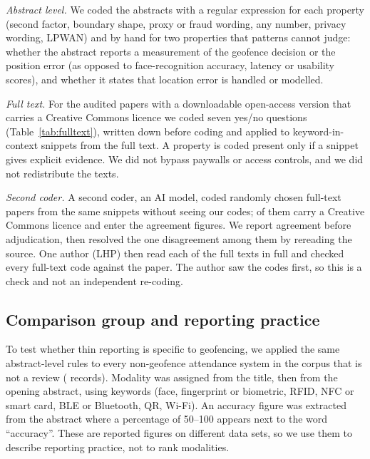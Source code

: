 \documentclass[12pt]{article}
\begin{document}
\emph{Abstract level.} We coded the abstracts with a regular expression for each property (second factor, boundary shape, proxy or fraud wording, any number, privacy wording, LPWAN) and by hand for two properties that patterns cannot judge: whether the abstract reports a measurement of the geofence decision or the position error (as opposed to face-recognition accuracy, latency or usability scores), and whether it states that location error is handled or modelled.

\emph{Full text.} For the audited papers with a downloadable open-access version that carries a Creative Commons licence we coded seven yes/no questions (Table~\ref{tab:fulltext}), written down before coding and applied to keyword-in-context snippets from the full text. A property is coded present only if a snippet gives explicit evidence. We did not bypass paywalls or access controls, and we did not redistribute the texts.

\emph{Second coder.} A second coder, an AI model, coded \agNAll{} randomly chosen full-text papers from the same snippets without seeing our codes; \agN{} of them carry a Creative Commons licence and enter the agreement figures. We report agreement before adjudication, then resolved the one disagreement among them by rereading the source. One author (LHP) then read each of the \ftN{} full texts in full and checked every full-text code against the paper. The author saw the codes first, so this is a check and not an independent re-coding.

\subsection{Comparison group and reporting practice}
To test whether thin reporting is specific to geofencing, we applied the same abstract-level rules to every non-geofence attendance system in the corpus that is not a review (\nOthers{} records). Modality was assigned from the title, then from the opening abstract, using keywords (face, fingerprint or biometric, RFID, NFC or smart card, BLE or Bluetooth, QR, Wi-Fi). An accuracy figure was extracted from the abstract where a percentage of 50--100 appears next to the word ``accuracy''. These are reported figures on different data sets, so we use them to describe reporting practice, not to rank modalities.
\end{document}

